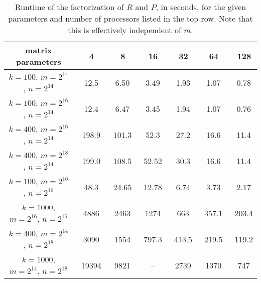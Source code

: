 \documentclass[11pt]{article}
\begin{document}
\begin{table}[here]
\centering
\begin{tabular}{|c|c|c|c|c|c|c|}\hline
matrix parameters &\ 4 &\ 8 &\ 16 &\ 32 &\ 64 &\ 128  \\ \hline
$k=100$, $m=2^{14}$, $n=2^{14}$ &\ 12.5 &\ 6.50 &\  3.49  &\  1.93 &\   1.07 &\  0.78 \\ 
$k=100$, $m=2^{16}$, $n=2^{14}$ &\  12.4 &\ 6.47  &\  3.45  &\ 1.94   &\  1.07   &\  0.76  \\ 
$k=400$, $m=2^{16}$, $n=2^{14}$ &\  198.9  &\ 101.3  &\   52.3 &\  27.2 &\  16.6  &\  11.4 \\ 
$k=400$, $m=2^{18}$, $n=2^{14}$ &\  199.0 &\  108.5 &\  52.52   &\ 30.3  &\   16.6 &\  11.4 \\ 
$k=100$, $m=2^{16}$, $n=2^{16}$ &\  48.3 &\  24.65 &\  12.78  &\   6.74 &\   3.73 &\  2.17 \\ 
$k=1000$, $m=2^{16}$, $n=2^{16}$ &\  4886 &\ 2463 &\  1274  &\  663  &\  357.1  &\  203.4 \\ 
$k=400$, $m=2^{14}$, $n=2^{18}$ &\ 3090  &\ 1554  &\ 797.3  &\ 413.5  &\   219.5 &\  119.2 \\ 
$k=1000$, $m=2^{14}$, $n=2^{18}$ &\  19394  &\ 9821  &\  --  &\ 2739   &\ 1370   &\  747   \\  \hline
\end{tabular}
\caption{Runtime of the factorization of $R$ and $P$, in seconds, for the given parameters and number of processors listed in the top row.  Note that this is effectively independent of $m$.}
\label{bigt3}
\end{table}
\end{document}
